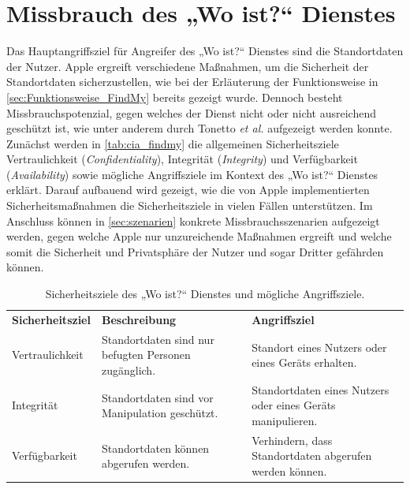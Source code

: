 \section{Missbrauch des „Wo ist?“ Dienstes}
\label{sec:Missbrauch}

Das Hauptangriffsziel für Angreifer des „Wo ist?“ Dienstes sind die Standortdaten der Nutzer.
Apple ergreift verschiedene Maßnahmen, um die Sicherheit der Standortdaten sicherzustellen, wie bei der Erläuterung der Funktionsweise in \autoref{sec:Funktionsweise_FindMy} bereits gezeigt wurde.
Dennoch besteht Missbrauchspotenzial, gegen welches der Dienst nicht oder nicht ausreichend geschützt ist, wie unter anderem durch Tonetto \textit{et al.} \cite{Tonetto_FindMy} aufgezeigt werden konnte.
Zunächst werden in \autoref{tab:cia_findmy} die allgemeinen Sicherheitsziele Vertraulichkeit (\textit{Confidentiality}), Integrität (\textit{Integrity}) und Verfügbarkeit (\textit{Availability}) sowie mögliche Angriffsziele im Kontext des „Wo ist?“ Dienstes erklärt.
Darauf aufbauend wird gezeigt, wie die von Apple implementierten Sicherheitsmaßnahmen die Sicherheitsziele in vielen Fällen unterstützen.
Im Anschluss können in \autoref{sec:szenarien} konkrete Missbrauchsszenarien aufgezeigt werden, gegen welche Apple nur unzureichende Maßnahmen ergreift und welche somit die Sicherheit und Privatsphäre der Nutzer und sogar Dritter gefährden können.

\begin{table}[h]
  \caption{Sicherheitsziele des „Wo ist?“ Dienstes und mögliche Angriffsziele.}
  \label{tab:cia_fincmy}
  \begin{tabularx}{\textwidth}{ |l|X|X| }
    \hline
    \textbf{Sicherheitsziel}  & \textbf{Beschreibung}                                               & \textbf{Angriffsziel}                                           \\
    \Xhline{0.5mm}
    \hline
    Vertraulichkeit           & Standortdaten sind nur befugten Personen zugänglich.                & Standort eines Nutzers oder eines Geräts erhalten.              \\
    \hline
    Integrität                & Standortdaten sind vor Manipulation geschützt.                      & Standortdaten eines Nutzers oder eines Geräts manipulieren.     \\
    \hline
    Verfügbarkeit             & Standortdaten können abgerufen werden.                              & Verhindern, dass Standortdaten abgerufen werden können.         \\
    \hline
  \end{tabularx}
\end{table}

